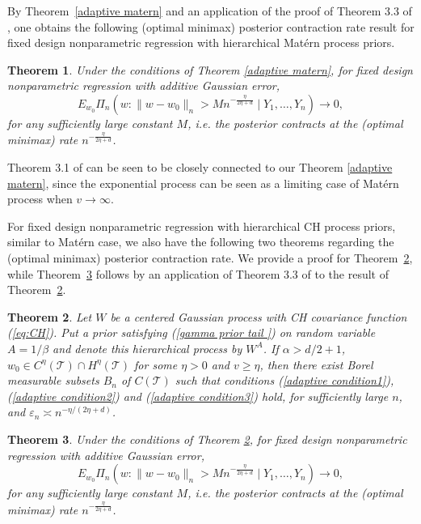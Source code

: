 \documentclass[ejs,noshowframe]{imsart}
\theoremstyle{plain}
\newtheorem{theorem}{Theorem}[section]
\theoremstyle{definition}
\theoremstyle{remark}
\begin{document}
By Theorem~\ref{adaptive matern} and an application of the proof of Theorem 3.3 of \cite{van2008rates}, one obtains  the following (optimal minimax) posterior contraction rate result for fixed design nonparametric  regression with hierarchical Mat\'ern  process priors.

\begin{theorem}
    Under the conditions of Theorem \ref{adaptive matern}, for
    fixed design nonparametric  regression with additive Gaussian error,      
$$
E_{w_0} \Pi_n(w:\|w-w_0\|_n >M n^{-\frac{\eta}{2\eta+d}} \mid Y_1,\ldots,Y_n)  \to 0,
$$
for any sufficiently large constant $M$, i.e.
    the posterior contracts at the (optimal minimax) rate $n^{-\frac{\eta}{2\eta+d}}$.

\end{theorem}

 Theorem 3.1 of \cite{van2009adaptive} can be seen to be closely connected to our Theorem \ref{adaptive matern}, since the exponential  process can be seen  as  a limiting case of Mat\'ern process when $v \to \infty$.

For  fixed design nonparametric  regression with hierarchical CH  process priors, similar to Mat\'ern case, we also have the following two theorems regarding the (optimal minimax) posterior contraction rate. We provide a proof for Theorem~\ref{adaptive CH}, while Theorem~\ref{th:vanCH} follows by an application of Theorem 3.3 of \citet{van2008rates} to the result of Theorem~\ref{adaptive CH}.
\begin{theorem}
    \label{adaptive CH}
Let $W$ be a centered  Gaussian process with  CH covariance function (\ref{eq:CH}).   Put a prior satisfying (\ref{gamma prior tail }) on random variable $A=1/\beta$ and denote this hierarchical process by $W^A$. If $\alpha>d/2+1$,  $w_0 \in C^{\eta}(\mathcal{T} )\cap H^{\eta}(\mathcal{T})$  for some $\eta > 0$ and  $v \ge \eta$,  then there exist Borel measurable subsets $B_n$ of  $C(\mathcal{T})$ such that conditions (\ref{adaptive condition1}), (\ref{adaptive condition2}) and (\ref{adaptive condition3}) hold, for  sufficiently large $n$, and $\varepsilon_n \asymp n^{-\eta /(2 \eta+d)}$.
\end{theorem}


\begin{theorem}\label{th:vanCH}
    Under the conditions of Theorem \ref{adaptive CH}, for
    fixed design nonparametric  regression with additive Gaussian error, 
$$
E_{w_0} \Pi_n(w:\|w-w_0\|_n >M n^{-\frac{\eta}{2\eta+d}} \mid Y_1,\ldots,Y_n)  \to 0,
$$
for any sufficiently large constant $M$, i.e.
    the posterior contracts at the (optimal minimax) rate $n^{-\frac{\eta}{2\eta+d}}$.
\end{theorem}
\end{document}
